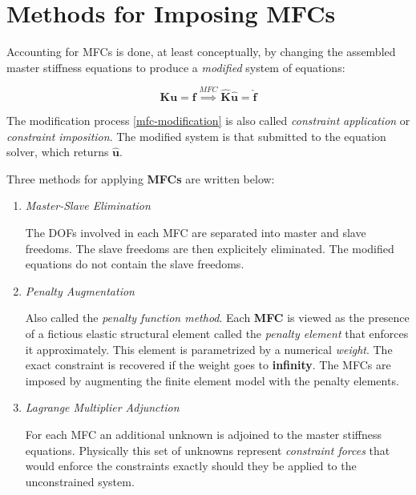 \documentclass[10pt,b5paper,titlepage]{book}
\begin{document}
\section{Methods for Imposing MFCs}

Accounting for MFCs is done, at least conceptually, by changing the assembled master
stiffness equations to produce a \textit{modified} system of equations:

\begin{equation}\label{mfc-modification}
    \mathbf{K} \mathbf{u} = \mathbf{f} \overset{MFC}{\implies}
    \hat{\mathbf{K}} \hat{\mathbf{u}} = \hat{\mathbf{f}}
\end{equation}

The modification process \eqref{mfc-modification} is also called  \textit{constraint}
\textit{application} or \textit{constraint imposition}. The modified system
is that submitted to the equation solver, which returns $ \hat{\mathbf{u}} $.

Three methods for applying \textbf{MFCs} are written below:

\begin{enumerate}
    \item \textit{Master-Slave Elimination}

        The DOFs involved in each MFC are separated into master and slave freedoms.
        The slave freedoms are then explicitely eliminated. The modified equations
        do not contain the slave freedoms.

    \item \textit{Penalty Augmentation}

        Also called the \textit{penalty function method}. Each \textbf{MFC}
        is viewed as the presence of a fictious elastic structural element called
        the \textit{penalty element} that enforces it approximately. This element
        is parametrized by a numerical \textit{weight}. The exact constraint is
        recovered if the weight goes to \textbf{infinity}. The MFCs are imposed
        by augmenting the finite element model with the penalty elements.

    \item \textit{Lagrange Multiplier Adjunction}

        For each MFC an additional unknown is adjoined to the master stiffness
        equations. Physically this set of unknowns represent
        \textit{constraint forces} that would enforce the constraints exactly
        should they be applied to the unconstrained system.
\end{enumerate}
\end{document}
